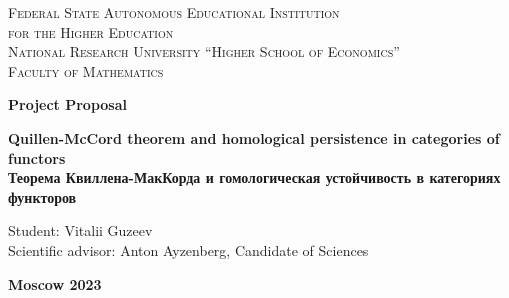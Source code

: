 \documentclass[english,12pt]{article}
\numberwithin{equation}{section}
\theoremstyle{definition}
\theoremstyle{remark}
\begin{document}

\begin{center}
{\scshape Federal State Autonomous Educational Institution\\
for the Higher Education\\
National Research University ``Higher School of Economics''\\[1ex]
Faculty of Mathematics\par}

\par\vfill


\textbf{\large Project Proposal}

\vspace{1cm}

{\Large\bfseries
Quillen-McCord theorem and homological persistence in categories of functors\\
\vspace{0.5cm}
Теорема Квиллена-МакКорда и гомологическая устойчивость в категориях функторов\par}

\vspace{3cm}

\begin{flushright}
\large Student: Vitalii Guzeev\\
\vspace{0.5cm}
\large Scientific advisor: Anton Ayzenberg, Candidate of Sciences
\end{flushright}

\par\vfill\vfill
\textbf{\large Moscow 2023}
\end{center}
\thispagestyle{empty}
\pagebreak
{}

\begin{abstract}
Quillen-McCord theorem gives a sufficient condition on a map between classifying spaces of posetal categories to be homotopy equivalence. Jonathan Ariel Barmak in his paper ({\cite{Bar11}}) gives an elementary topological proof and proves a homological version of the theorem.

We formulate and prove the homological Quillen-McCord theorem in the setting of persistent homology using the technique of interleaving distances (according to {\cite{GS16}}) and generalized persistence theorem ({\cite{Corbet18}}). To establish the technique we introduce persistence objects as objects in appropriate functor categories and prove several results, e.g. order extension principle for objects in Fun(I, Pos) and approximate triviality of left derived functors of approximately trivial objects in Fun(I, R-Mod).

Since the given proof gives explicit Lipschitz constant for the map of persistence classifying spaces, we expect this result to be useful in TDA for reducing the complexity of experimental data.
\end{abstract}
\end{document}
